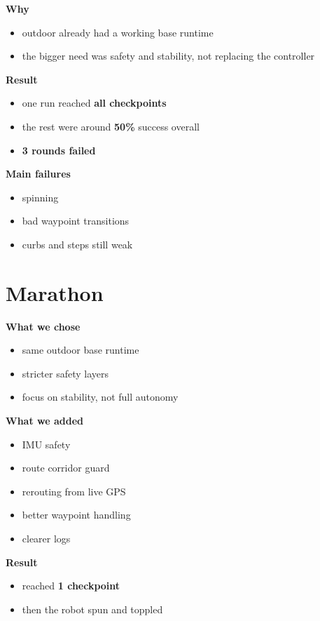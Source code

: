\documentclass[11pt]{article}
\begin{document}
\textbf{Why}
\begin{itemize}[leftmargin=*]
\item outdoor already had a working base runtime
\item the bigger need was safety and stability, not replacing the controller
\end{itemize}

\textbf{Result}
\begin{itemize}[leftmargin=*]
\item one run reached \textbf{all checkpoints}
\item the rest were around \textbf{50\%} success overall
\item \textbf{3 rounds failed}
\end{itemize}

\textbf{Main failures}
\begin{itemize}[leftmargin=*]
\item spinning
\item bad waypoint transitions
\item curbs and steps still weak
\end{itemize}

\section*{Marathon}
\textbf{What we chose}
\begin{itemize}[leftmargin=*]
\item same outdoor base runtime
\item stricter safety layers
\item focus on stability, not full autonomy
\end{itemize}

\textbf{What we added}
\begin{itemize}[leftmargin=*]
\item IMU safety
\item route corridor guard
\item rerouting from live GPS
\item better waypoint handling
\item clearer logs
\end{itemize}

\textbf{Result}
\begin{itemize}[leftmargin=*]
\item reached \textbf{1 checkpoint}
\item then the robot spun and toppled
\end{itemize}
\end{document}
